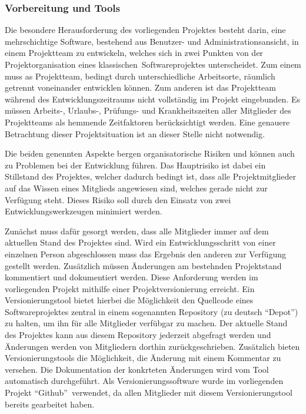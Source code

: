 \subsubsection{Vorbereitung und Tools}
\label{sec:VorbereitungUndTools}

Die besondere Herausforderung des vorliegenden Projektes besteht darin, eine
mehrschichtige Software, bestehend aus Benutzer- und Administrationsansicht, in
einem Projektteam zu entwickeln, welches sich in zwei Punkten von der
Projektorganisation eines klassischen\footnotemark\ Softwareprojektes
unterscheidet. Zum einem muss  as Projektteam, bedingt durch unterschiedliche
Arbeitsorte, räumlich getrennt voneinander entwicklen können. Zum anderen
ist das Projektteam während des Entwicklungszeitraums nicht vollständig im
Projekt eingebunden. Es müssen Arbeits-, Urlaubs-, Prüfungs- und
Krankheitszeiten aller Mitglieder des Projektteams als hemmende Zeitfaktoren
berücksichtigt werden. Eine genauere Betrachtung dieser Projektsituation ist an
dieser Stelle nicht notwendig.


Die beiden genennten Aspekte bergen organisatorische Risiken und können auch zu
Problemen bei der Entwicklung führen. Das Hauptrisiko ist dabei ein Stillstand
des Projektes, welcher dadurch bedingt ist, dass alle Projektmitglieder auf das
Wissen eines Mitglieds angewiesen sind, welches gerade nicht zur Verfügung
steht. Dieses Risiko soll durch den Einsatz von zwei Entwicklungswerkzeugen
minimiert werden.

Zunächst muss dafür gesorgt werden, dass alle Mitglieder immer auf dem
aktuellen Stand des Projektes sind. Wird ein Entwicklungsschritt von einer
einzelnen Person abgeschlossen muss das Ergebnis den anderen zur Verfügung
gestellt werden. Zusätzlich müssen Änderungen am bestehnden Projektstand
kommentiert und dokumentiert werden. Diese Anforderung werden im vorliegenden
Projekt mithilfe einer Projektversionierung erreicht. Ein Versionierungstool
bietet hierbei die Möglichkeit den Quellcode eines Softwareprojektes zentral in
einem sogenannten Repository (zu deutsch "`Depot"') zu halten, um ihn für alle
Mitglieder verfübgar zu machen. Der aktuelle Stand des Projektes kann aus
diesem Repository jederzeit abgefragt werden und Änderungen werden von
Mitgliedern dorthin zurückgeschrieben. Zusätzlich bieten Versionierungstools die
Möglichkeit, die Änderung mit einem Kommentar zu versehen. Die Dokumentation der
konkrteten Änderungen wird vom Tool automatisch durchgeführt. Als
Versionierungssoftware wurde im vorliegenden Projekt "`Github"'\footnotemark\
verwendet, da allen Mitglieder mit diesem Versionierungstool bereits gearbeitet
haben.


